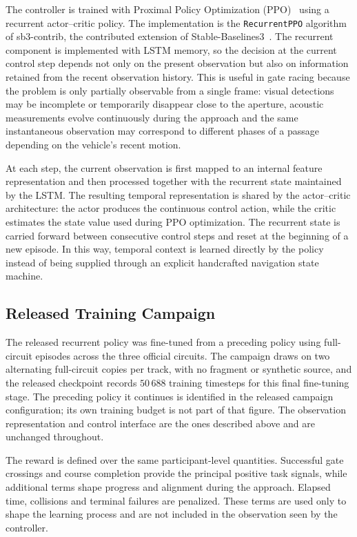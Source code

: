 The controller is trained with Proximal Policy Optimization
(PPO)~\cite{schulman2017ppo} using a recurrent actor--critic policy. The
implementation is the \texttt{RecurrentPPO} algorithm of sb3-contrib, the
contributed extension of Stable-Baselines3~\cite{raffin2021sb3}. The recurrent
component is implemented with LSTM memory, so the decision at the current control
step depends not only on the present observation but also on information retained
from the recent observation history. This is useful in gate racing because the
problem is only partially observable from a single frame: visual detections may
be incomplete or temporarily disappear close to the aperture, acoustic
measurements evolve continuously during the approach and the same instantaneous
observation may correspond to different phases of a passage depending on the
vehicle's recent motion.

At each step, the current observation is first mapped to an internal feature
representation and then processed together with the recurrent state maintained by
the LSTM. The resulting temporal representation is shared by the actor--critic
architecture: the actor produces the continuous control action, while the critic
estimates the state value used during PPO optimization. The recurrent state is
carried forward between consecutive control steps and reset at the beginning of a
new episode. In this way, temporal context is learned directly by the policy
instead of being supplied through an explicit handcrafted navigation state
machine.

\subsection{Released Training Campaign}
\label{sec:learning_training}

The released recurrent policy was fine-tuned from a preceding policy using
full-circuit episodes across the three official circuits. The campaign draws on
two alternating full-circuit copies per track, with no fragment or synthetic
source, and the released checkpoint records $50\,688$ training timesteps for this
final fine-tuning stage. The preceding policy it continues is identified in the
released campaign configuration; its own training budget is not part of that
figure. The observation representation and control interface are the ones
described above and are unchanged throughout.

The reward is defined over the same participant-level quantities. Successful gate
crossings and course completion provide the principal positive task signals, while
additional terms shape progress and alignment during the approach. Elapsed time,
collisions and terminal failures are penalized. These terms are used only to shape
the learning process and are not included in the observation seen by the
controller.

